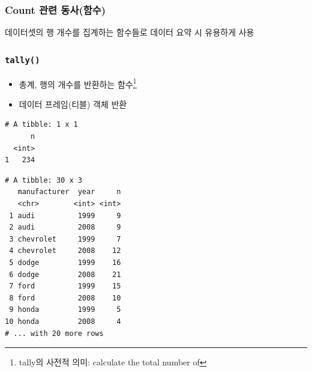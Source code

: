 \documentclass[
  11pt,
]{krantz}
\makeatletter
\newenvironment{Shaded}{\begin{snugshade}}{\end{snugshade}}
\newcommand{\CommentTok}[1]{\textcolor[rgb]{0.37,0.37,0.37}{\textit{#1}}}
\newcommand{\KeywordTok}[1]{\textcolor[rgb]{0.27,0.27,0.27}{\textbf{#1}}}
\newcommand{\NormalTok}[1]{#1}
\newcommand{\OperatorTok}[1]{\textcolor[rgb]{0.43,0.43,0.43}{\textbf{#1}}}
\newcommand{\StringTok}[1]{\textcolor[rgb]{0.5,0.5,0.5}{#1}}
\providecommand{\tightlist}{%
  \setlength{\itemsep}{0pt}\setlength{\parskip}{0pt}}
\newenvironment{kframe}{%
\medskip{}
\setlength{\fboxsep}{.8em}
 \def\at@end@of@kframe{}%
 \ifinner\ifhmode%
  \def\at@end@of@kframe{\end{minipage}}%
  \begin{minipage}{\columnwidth}%
 \fi\fi%
 \def\FrameCommand##1{\hskip\@totalleftmargin \hskip-\fboxsep
 \colorbox{shadecolor}{##1}\hskip-\fboxsep
     \hskip-\linewidth \hskip-\@totalleftmargin \hskip\columnwidth}%
 \MakeFramed {\advance\hsize-\width
   \@totalleftmargin\z@ \linewidth\hsize
   \@setminipage}}%
 {\par\unskip\endMakeFramed%
 \at@end@of@kframe}
\renewenvironment{quote}{\begin{kframe}}{\end{kframe}}
\makeatother
\begin{document}
\hypertarget{dplyr-count}{%
\subsubsection*{\texorpdfstring{\textbf{Count 관련 동사(함수)}}{Count 관련 동사(함수)}}\label{dplyr-count}}


\begin{quote}
데이터셋의 행 개수를 집계하는 함수들로 데이터 요약 시 유용하게 사용
\end{quote}

\hypertarget{tally}{%
\subsubsection*{\texorpdfstring{\texttt{tally()}}{tally()}}\label{tally}}


\begin{itemize}
\tightlist
\item
  총계, 행의 개수를 반환하는 함수\footnote{tally의 사전적 의미: calculate the total number of}
\item
  데이터 프레임(티블) 객체 반환
\end{itemize}

\footnotesize

\begin{Shaded}
\end{Shaded}

\begin{verbatim}
# A tibble: 1 x 1
      n
  <int>
1   234
\end{verbatim}

\begin{Shaded}
\end{Shaded}

\begin{verbatim}
# A tibble: 30 x 3
   manufacturer  year     n
   <chr>        <int> <int>
 1 audi          1999     9
 2 audi          2008     9
 3 chevrolet     1999     7
 4 chevrolet     2008    12
 5 dodge         1999    16
 6 dodge         2008    21
 7 ford          1999    15
 8 ford          2008    10
 9 honda         1999     5
10 honda         2008     4
# ... with 20 more rows
\end{verbatim}
\end{document}
